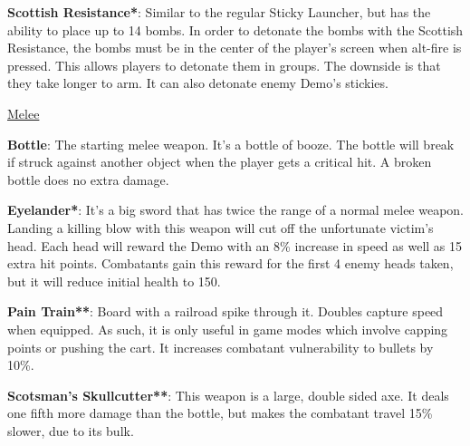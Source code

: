 {\bf Scottish Resistance*}: Similar to the regular Sticky Launcher, but has the ability to place up to 14 bombs. In order to detonate the bombs with the Scottish Resistance, the bombs must be in the center of the player's screen when alt-fire is pressed. This allows players to detonate them in groups. The downside is that they take longer to arm. It can also detonate enemy Demo's stickies.

\newpage

\begin {center}
\underline {Melee}
\end {center}

{\bf Bottle}: The starting melee weapon. It's a bottle of booze. The bottle will break if struck against another object when the player gets a critical hit. A broken bottle does no extra damage.

{\bf Eyelander*}: It's a big sword that has twice the range of a normal melee weapon. Landing a killing blow with this weapon will cut off the unfortunate victim's head. Each head will reward the Demo with an 8\% increase in speed as well as 15 extra hit points. Combatants gain this reward for the first 4 enemy heads taken, but it will reduce initial health to 150.

{\bf Pain Train**}: Board with a railroad spike through it. Doubles capture speed when equipped. As such, it is only useful in game modes which involve capping points or pushing the cart. It increases combatant vulnerability to bullets by 10\%.

{\bf Scotsman's Skullcutter**}: This weapon is a large, double sided axe.  It deals one fifth more damage than the bottle, but makes the combatant travel 15\% slower, due to its bulk.


